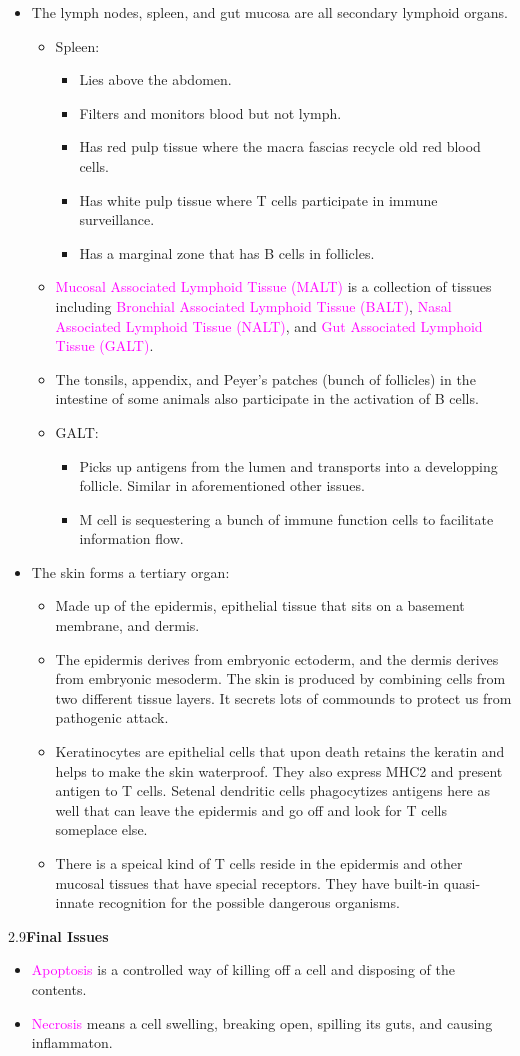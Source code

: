 \documentclass[UTF8]{book}
\newcommand{\concept}[1]{\textcolor{magenta}{#1}}
\begin{document}
\begin{itemize}
\item The lymph nodes, spleen, and gut mucosa are all secondary lymphoid organs. \begin{itemize}
	\item Spleen:
	\begin{itemize}
		\item Lies above the abdomen.
		\item Filters and monitors blood but not lymph.
		\item Has red pulp tissue where the macra fascias recycle old red blood cells.
		\item Has white pulp tissue where T cells participate in immune surveillance.
		\item Has a marginal zone that has B cells in follicles.
	\end{itemize}
	\item \concept{Mucosal Associated Lymphoid Tissue (MALT)} is a collection of tissues including \concept{Bronchial Associated Lymphoid Tissue (BALT)}, \concept{Nasal Associated Lymphoid Tissue (NALT)}, and \concept{Gut Associated Lymphoid Tissue (GALT)}.
	\item The tonsils, appendix, and Peyer's patches (bunch of follicles) in the intestine of some animals also participate in the activation of B cells.
	\item GALT:
	\begin{itemize}
		\item Picks up antigens from the lumen and transports into a developping follicle. Similar in aforementioned other issues.
		\item M cell is sequestering a bunch of immune function cells to facilitate information flow.
	\end{itemize}
\end{itemize}
\item The skin forms a tertiary organ:
\begin{itemize}
	\item Made up of the epidermis, epithelial tissue that sits on a basement membrane, and dermis.
	\item The epidermis derives from embryonic ectoderm, and the dermis derives from embryonic mesoderm. The skin is produced by combining cells from two different tissue layers. It secrets lots of commounds to protect us from pathogenic attack.
	\item Keratinocytes are epithelial cells that upon death retains the keratin and helps to make the skin waterproof. They also express MHC2 and present antigen to T cells. Setenal dendritic cells phagocytizes antigens here as well that can leave the epidermis and go off and look for T cells someplace else.
	\item There is a speical kind of T cells reside in the epidermis and other mucosal tissues that have special receptors. They have built-in quasi-innate recognition for the possible dangerous organisms.
\end{itemize}
\end{itemize}
2.9\quad \textbf{Final Issues}
\begin{itemize}
\item \concept{Apoptosis} is a controlled way of killing off a cell and disposing of the contents.
\item \concept{Necrosis} means a cell swelling, breaking open, spilling its guts, and causing inflammaton.
\end{itemize}
\end{document}
